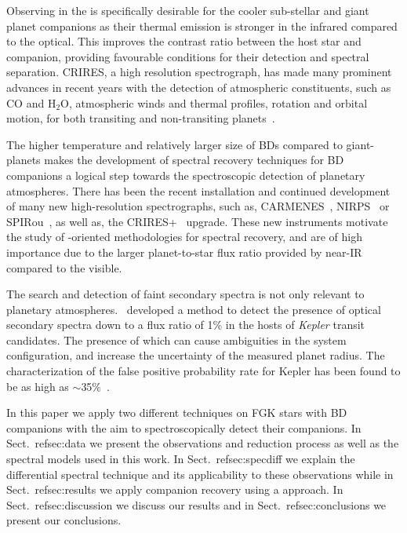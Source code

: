 Observing in the \nir{}is specifically desirable for the cooler sub-stellar and giant planet companions as their thermal emission is stronger in the infrared compared to the optical. This improves the contrast ratio between the host star and companion, providing favourable conditions for their detection and spectral separation. CRIRES, a high resolution \nir{}spectrograph, has made many prominent advances in recent years with the detection of atmospheric constituents, such as \(\textrm{CO} \) and \(\textrm{H}_{2}\textrm{O} \), atmospheric winds and thermal profiles, rotation and orbital motion, for both transiting and non-transiting planets~\citep[e.g.][]{snellen_orbital_2010, brogi_signature_2012, rodler_weighing_2012, dekok_detection_2013, brogi_carbon_2014, snellen_fast_2014, piskorz_evidence_2016, brogi_rotation_2016, birkby_discovery_2017}.

The higher temperature and relatively larger size of BDs compared to giant-planets makes the development of spectral recovery techniques for BD companions a logical step towards the spectroscopic detection of planetary atmospheres. There has been the recent installation and continued development of many new high-resolution \nir{}spectrographs, such as, {CARMENES}~\citep{quirrenbach_carmenes_2014}, NIRPS~\citep{bouchy_nearinfrared_2017} or SPIRou~\citep{artigau_spirou_2014}, as well as, the CRIRES+~\citep{dorn_crires_2016} upgrade. These new instruments motivate the study of \nir{}-oriented methodologies for spectral recovery, and are of high importance due to the larger planet-to-star flux ratio provided by near-IR compared to the visible.

{\rd{} The search and detection of faint secondary spectra is not only relevant to planetary atmospheres.~\citet{kolbl_detection_2015} developed a method to detect the presence of optical secondary spectra down to a flux ratio of 1\% in the hosts of \emph{Kepler} transit candidates. The presence of which can cause ambiguities in the system configuration, and increase the uncertainty of the measured planet radius. The characterization of the false positive probability rate for Kepler has been found to be as high as  \(\sim\)35\%~\citet{santerne_sophie_2012}.}

In this paper we apply two different techniques on FGK stars with BD companions with the aim to spectroscopically detect their companions. In Sect.~ref{sec:data} we present the observations and reduction process as well as the spectral models used in this work. In Sect.~ref{sec:specdiff} we explain the differential spectral technique and its applicability to these observations while in Sect.~ref{sec:results} we apply companion recovery using a \textchisquared approach. In Sect.~ref{sec:discussion} we discuss our results and in Sect.~ref{sec:conclusions} we present our conclusions.
